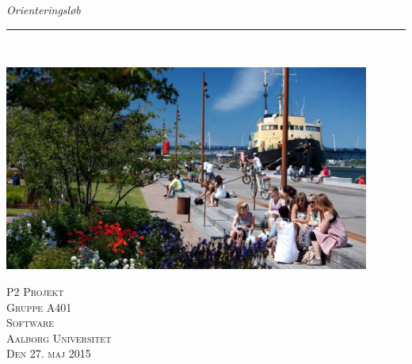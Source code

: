 \thispagestyle{empty}
\begin{flushright}
\vspace{3cm}

\phantom{hul}

\phantom{hul}

\phantom{hul}

\textsl{\Huge Orienteringsløb} \\ \vspace{1cm}

\rule{13cm}{3mm} \\ \vspace{1.5cm}
\vspace{1cm}

\includegraphics[width=0.90\textwidth]{billeder/aalborghavnefront}
\vspace{4cm}

\vspace{2cm} 
\textsc{\Large P2 Projekt \\
Gruppe A401 \\
Software\\
Aalborg Universitet\\
Den 27. maj 2015\\}
\end{flushright}
